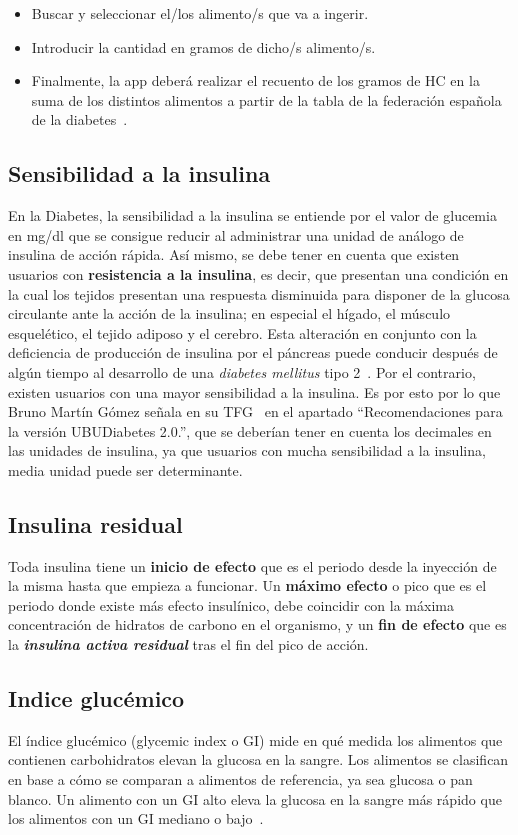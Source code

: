 \begin{itemize}
	\item Buscar y seleccionar el/los alimento/s que va a ingerir.
	\item Introducir la cantidad en gramos de dicho/s alimento/s.
	\item Finalmente, la app deberá realizar el recuento de los gramos de HC en la suma de los distintos alimentos a partir de la tabla de la federación española de la diabetes~\cite{tablafe}.
\end{itemize}
\subsection{Sensibilidad a la insulina}
En la Diabetes, la sensibilidad a la insulina se entiende por el valor de glucemia en mg/dl que se consigue reducir al administrar una unidad de análogo de insulina de acción rápida.
Así mismo, se debe tener en cuenta que existen usuarios con \textbf{resistencia a la insulina}, es decir, que presentan una condición en la cual los tejidos presentan una respuesta disminuida para disponer de la glucosa circulante ante la acción de la insulina; en especial el hígado, el músculo esquelético, el tejido adiposo y el cerebro. Esta alteración en conjunto con la deficiencia de producción de insulina por el páncreas puede conducir después de algún tiempo al desarrollo de una \textit{diabetes mellitus} tipo 2~\cite{wiki:resisinsu}.
Por el contrario, existen usuarios con una mayor sensibilidad a la insulina. Es por esto por lo que Bruno Martín Gómez señala en su TFG~\cite{bruno2017} en el apartado ``Recomendaciones para la versión UBUDiabetes 2.0.'', que se deberían tener en cuenta los decimales en las unidades de insulina, ya que usuarios con mucha sensibilidad a la insulina, media unidad puede ser determinante.

\subsection{Insulina residual}
Toda insulina tiene un \textbf{inicio de efecto} que es el periodo desde la inyección de la misma hasta que empieza a funcionar. Un \textbf{máximo efecto} o pico que es el periodo donde existe más efecto insulínico, debe coincidir con la máxima concentración de hidratos de carbono en el organismo, y un \textbf{fin de efecto} que es la \textbf{\textit{insulina activa residual}} tras el fin del pico de acción.
\subsection{Indice glucémico}
El índice glucémico (glycemic index o GI) mide en qué medida los alimentos que contienen carbohidratos elevan la glucosa en la sangre.
Los alimentos se clasifican en base a cómo se comparan a alimentos de referencia, ya sea glucosa o pan blanco. Un alimento con un GI alto eleva la glucosa en la sangre más rápido que los alimentos con un GI mediano o bajo~\cite{indicegluce}.
